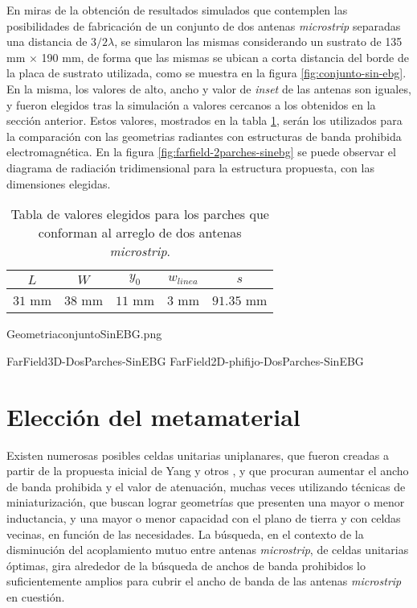 En miras de la obtención de resultados simulados que contemplen las posibilidades de fabricación de un conjunto de dos antenas \textit{microstrip} separadas una distancia de $3/2 \lambda$, se simularon las mismas considerando un sustrato de 135 mm $\times$ 190 mm, de forma que las mismas se ubican a corta distancia del borde de la placa de sustrato utilizada, como se muestra en la figura \ref{fig:conjunto-sin-ebg}. En la misma, los valores de alto, ancho y valor de \textit{inset} de las antenas son iguales, y fueron elegidos tras la simulación a valores cercanos a los obtenidos en la sección anterior. Estos valores, mostrados en la tabla \ref{table:valores-dosparches-geometria}, serán los utilizados para la comparación con las geometrias radiantes con estructuras de banda prohibida electromagnética. En la figura \ref{fig:farfield-2parches-sinebg} se puede observar el diagrama de radiación tridimensional para la estructura propuesta, con las dimensiones elegidas.

\begin{table}
	\centering
	\begin{tabular}{c|c|c|c|c}
		$L$ & $W$ & $y_0$ & $w_{linea}$ & $s$ \\
		\hline
		$31$ mm & $38$ mm & $11$ mm & $3$ mm & $91.35$ mm
	\end{tabular}
	\caption{Tabla de valores elegidos para los parches que conforman al arreglo de dos antenas \textit{microstrip}.}
	\label{table:valores-dosparches-geometria}
\end{table}

GeometriaconjuntoSinEBG.png

FarField3D-DosParches-SinEBG
FarField2D-phifijo-DosParches-SinEBG



\section{Elección del metamaterial}
\label{sec_eleccion}

Existen numerosas posibles celdas unitarias uniplanares, que fueron creadas a partir de la propuesta inicial de Yang y otros \cite{Yang:UCPBG}, y que procuran aumentar el ancho de banda prohibida y el valor de atenuación, muchas veces utilizando técnicas de miniaturización, que buscan lograr geometrías que presenten una mayor o menor inductancia, y una mayor o menor capacidad con el plano de tierra y con celdas vecinas, en función de las necesidades. La búsqueda, en el contexto de la disminución del acoplamiento mutuo entre antenas \textit{microstrip}, de celdas unitarias óptimas, gira alrededor de la búsqueda de anchos de banda prohibidos lo suficientemente amplios para cubrir el ancho de banda de las antenas \textit{microstrip} en cuestión.

